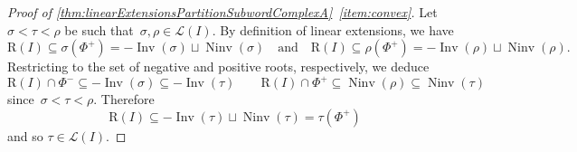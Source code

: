 \documentclass[reqno]{amsart}
\theoremstyle{definition}
\DeclareMathOperator{\Inv}{Inv} %
\DeclareMathOperator{\Ninv}{Ninv} %
\newcommand{\linearExtensions}{\mathcal{L}} %
\newcommand{\Roots}{\mathrm{R}} %
\begin{document}
\begin{proof}[Proof of \cref{thm:linearExtensionsPartitionSubwordComplexA}~\eqref{item:convex}]
Let $\sigma < \tau < \rho$ be such that~$\sigma, \rho \in \linearExtensions(I)$.
By definition of linear extensions, we have
\[
\Roots(I) \subseteq \sigma(\Phi^+)=-\Inv(\sigma) \sqcup \Ninv(\sigma)
\quad\text{and}\quad
\Roots(I) \subseteq \rho(\Phi^+)=-\Inv(\rho) \sqcup \Ninv(\rho).
\]
Restricting to the set of negative and positive roots, respectively, we deduce
\[
\Roots(I) \cap \Phi^- \subseteq -\Inv(\sigma) \subseteq -\Inv(\tau) \qquad 
\Roots(I) \cap \Phi^+ \subseteq \Ninv(\rho)  \subseteq \Ninv(\tau)
\]
since~$\sigma < \tau < \rho$. Therefore
\[
\Roots(I) \subseteq -\Inv(\tau) \sqcup \Ninv(\tau) = \tau(\Phi^+)
\]
and so $\tau \in \linearExtensions(I)$.
\end{proof}
\end{document}
